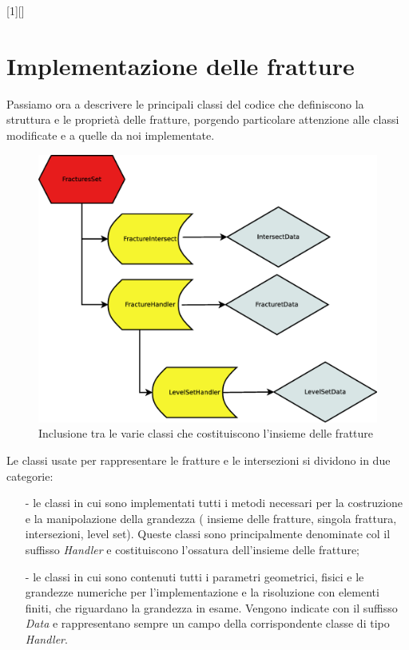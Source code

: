 [1][]{}{}

\chapter{Implementazione delle fratture}
Passiamo ora a descrivere le principali classi del codice che definiscono la struttura e le proprietà delle fratture, porgendo particolare attenzione alle classi modificate e a quelle da noi implementate.\\

\begin{figure}[htbp]
\includegraphics[width=1\textwidth]{img/subcap3_2/fratture.eps}
\caption{Inclusione tra le varie classi che costituiscono l'insieme delle fratture}\label{Inclusione classi}
\end{figure}


\par Le classi usate per rappresentare le fratture e le intersezioni si dividono in due categorie:
\begin{enumerate}
\item[-] le classi in cui sono implementati tutti i metodi necessari per la costruzione e la manipolazione della grandezza ( insieme delle fratture, singola frattura, intersezioni, level set). Queste classi sono principalmente denominate col il suffisso \textit{Handler} e costituiscono l'ossatura dell'insieme delle fratture;
\item[-] le classi in cui sono contenuti tutti i parametri geometrici, fisici e le grandezze numeriche per l'implementazione e la risoluzione con elementi finiti, che riguardano la grandezza in esame. Vengono indicate con il suffisso \textit{Data} e rappresentano sempre un campo della corrispondente classe di tipo \textit{Handler}.
\end{enumerate}




